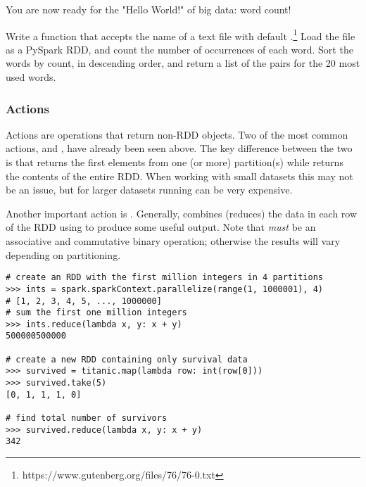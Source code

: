 \begin{problem}
You are now ready for the "Hello World!" of big data: word count! 

Write a function that accepts the name of a text file with default .\footnote{https://www.gutenberg.org/files/76/76-0.txt}
Load the file as a PySpark RDD, and count the number of occurrences of each word. 
Sort the words by count, in descending order, and return a list of the  pairs for the 20 most used words.
\label{prob:spark-rdd-hello-world}
\end{problem}

\subsubsection*{Actions}
Actions are operations that return non-RDD objects.
Two of the most common actions,  and , have already been seen above.
The key difference between the two is that  returns the first  elements from one (or more) partition(s) while  returns the contents of the entire RDD.
When working with small datasets this may not be an issue, but for larger datasets running  can be very expensive.

Another important action is . Generally,  combines (reduces) the data in each row of the RDD using  to produce some useful output. Note that  \textit{must} be an associative and commutative binary operation; otherwise the results will vary depending on partitioning.

\begin{lstlisting}
# create an RDD with the first million integers in 4 partitions
>>> ints = spark.sparkContext.parallelize(range(1, 1000001), 4)
# [1, 2, 3, 4, 5, ..., 1000000]
# sum the first one million integers
>>> ints.reduce(lambda x, y: x + y)
500000500000

# create a new RDD containing only survival data
>>> survived = titanic.map(lambda row: int(row[0]))
>>> survived.take(5)
[0, 1, 1, 1, 0]

# find total number of survivors
>>> survived.reduce(lambda x, y: x + y)
342
\end{lstlisting}

